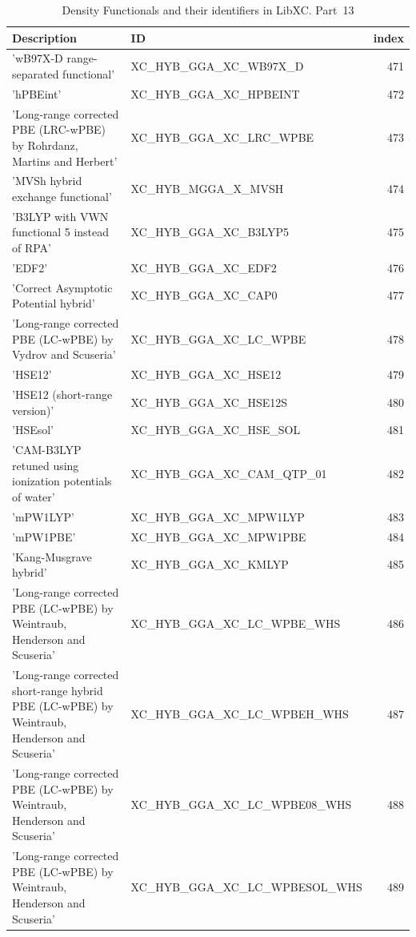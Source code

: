 \documentclass[final,12pt]{article}
\begin{document}
{{{{{{\begin{table}[!h]
\caption{Density Functionals and their identifiers in LibXC. Part~13}
\begin{center}
\begin{tabular}{llr}
\hline
\hline
Description & ID & index\\
\hline
  'wB97X-D range-separated functional' & XC\_HYB\_GGA\_XC\_WB97X\_D  &471\\
  'hPBEint' & XC\_HYB\_GGA\_XC\_HPBEINT  &472\\
  'Long-range corrected PBE (LRC-wPBE) by Rohrdanz, Martins and Herbert' & XC\_HYB\_GGA\_XC\_LRC\_WPBE  &473\\
  'MVSh hybrid exchange functional' & XC\_HYB\_MGGA\_X\_MVSH  &474\\
  'B3LYP with VWN functional 5 instead of RPA' & XC\_HYB\_GGA\_XC\_B3LYP5  &475\\
  'EDF2' & XC\_HYB\_GGA\_XC\_EDF2  &476\\
  'Correct Asymptotic Potential hybrid' & XC\_HYB\_GGA\_XC\_CAP0  &477\\
  'Long-range corrected PBE (LC-wPBE) by Vydrov and Scuseria' & XC\_HYB\_GGA\_XC\_LC\_WPBE  &478\\
  'HSE12' & XC\_HYB\_GGA\_XC\_HSE12  &479\\
  'HSE12 (short-range version)' & XC\_HYB\_GGA\_XC\_HSE12S  &480\\
  'HSEsol' & XC\_HYB\_GGA\_XC\_HSE\_SOL  &481\\
  'CAM-B3LYP retuned using ionization potentials of water' & XC\_HYB\_GGA\_XC\_CAM\_QTP\_01  &482\\
  'mPW1LYP' & XC\_HYB\_GGA\_XC\_MPW1LYP  &483\\
  'mPW1PBE' & XC\_HYB\_GGA\_XC\_MPW1PBE  &484\\
  'Kang-Musgrave hybrid' & XC\_HYB\_GGA\_XC\_KMLYP  &485\\
  'Long-range corrected PBE (LC-wPBE) by Weintraub, Henderson and Scuseria' & XC\_HYB\_GGA\_XC\_LC\_WPBE\_WHS  &486\\
  'Long-range corrected short-range hybrid PBE (LC-wPBE) by Weintraub, Henderson and Scuseria' & XC\_HYB\_GGA\_XC\_LC\_WPBEH\_WHS  &487\\
  'Long-range corrected PBE (LC-wPBE) by Weintraub, Henderson and Scuseria' & XC\_HYB\_GGA\_XC\_LC\_WPBE08\_WHS  &488\\
  'Long-range corrected PBE (LC-wPBE) by Weintraub, Henderson and Scuseria' & XC\_HYB\_GGA\_XC\_LC\_WPBESOL\_WHS  &489\\

\end{tabular}
\end{center}
\end{table}}}}}}}
\end{document}
